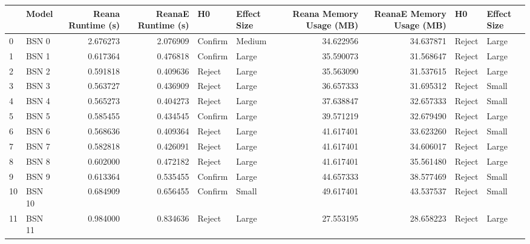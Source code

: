 \begin{tabular}{llrrllrrll}
\toprule
{} &   Model &  Reana Runtime (s) &  ReanaE Runtime (s) &       H0 & Effect Size &  Reana Memory Usage (MB) &  ReanaE Memory Usage (MB) &       H0 & Effect Size \\
\midrule
0  &   BSN 0 &           2.676273 &            2.076909 &  Confirm &      Medium &                34.622956 &                 34.637871 &   Reject &       Large \\
1  &   BSN 1 &           0.617364 &            0.476818 &  Confirm &       Large &                35.590073 &                 31.568647 &   Reject &       Large \\
2  &   BSN 2 &           0.591818 &            0.409636 &   Reject &       Large &                35.563090 &                 31.537615 &   Reject &       Large \\
3  &   BSN 3 &           0.563727 &            0.436909 &   Reject &       Large &                36.657333 &                 31.695312 &   Reject &       Small \\
4  &   BSN 4 &           0.565273 &            0.404273 &   Reject &       Large &                37.638847 &                 32.657333 &   Reject &       Small \\
5  &   BSN 5 &           0.585455 &            0.434545 &  Confirm &       Large &                39.571219 &                 32.679490 &   Reject &       Large \\
6  &   BSN 6 &           0.568636 &            0.409364 &   Reject &       Large &                41.617401 &                 33.623260 &   Reject &       Small \\
7  &   BSN 7 &           0.582818 &            0.426091 &   Reject &       Large &                41.617401 &                 34.606017 &   Reject &       Large \\
8  &   BSN 8 &           0.602000 &            0.472182 &   Reject &       Large &                41.617401 &                 35.561480 &   Reject &       Large \\
9  &   BSN 9 &           0.613364 &            0.535455 &  Confirm &       Large &                44.657333 &                 38.577469 &   Reject &       Small \\
10 &  BSN 10 &           0.684909 &            0.656455 &  Confirm &       Small &                49.617401 &                 43.537537 &   Reject &       Small \\
11 &  BSN 11 &           0.984000 &            0.834636 &   Reject &       Large &                27.553195 &                 28.658223 &   Reject &       Large \\

\end{tabular}
